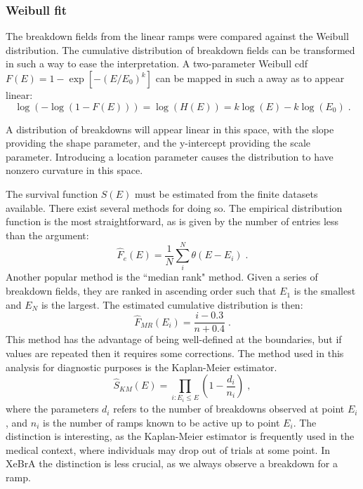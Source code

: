 \subsubsection{Weibull fit}
The breakdown fields from the linear ramps were compared against the Weibull distribution.
The cumulative distribution of breakdown fields can be transformed in such a way to ease the interpretation.
A two-parameter Weibull cdf $F(E) = 1 - \exp[-(E/E_0)^k]$ can be mapped in such a away as to appear linear: 
\begin{equation}
    \log (-\log(1-F(E))) = \log(H(E)) = k \log(E) - k \log(E_0)\;.
\end{equation}

A distribution of breakdowns will appear linear in this space, with the slope providing the shape parameter, and the y-intercept providing the scale parameter.
Introducing a location parameter causes the distribution to have nonzero curvature in this space.

The survival function $S(E)$ must be estimated from the finite datasets available.
There exist several methods for doing so.
The empirical distribution function is the most straightforward, as is given by the number of entries less than the argument: 
\begin{equation}
    \hat{F}_e(E) =\frac{1}{N} \sum_i^N \theta(E- E_i) \;.
\end{equation}
Another popular method is the ``median rank" method\cite{nassar_using_2005}.
Given a series of breakdown fields, they are ranked in ascending order such that $E_1$ is the smallest and $E_N$ is the largest.
The estimated cumulative distribution is then:
\begin{equation}
    \hat{F}_{MR}(E_i) = \frac{ i - 0.3}{n+0.4}\;.
\end{equation}
This method has the advantage of being well-defined at the boundaries, but if values are repeated then it requires some corrections.
The method used in this analysis for diagnostic purposes is the Kaplan-Meier estimator\cite{kaplan_nonparametric_1958}.
\begin{equation}
    \hat{S}_{KM}(E) = \prod_{i :E_i \leq E} (1- \frac{d_i}{n_i})\;,
\end{equation}
\noindent
where the parameters $d_i$ refers to the number of breakdowns observed at point $E_i$, and $n_i$ is the number of ramps known to be active up to point $E_i$. 
The distinction is interesting, as the Kaplan-Meier estimator is frequently used in the medical context, where individuals may drop out of trials at some point.
In XeBrA the distinction is less crucial, as we always observe a breakdown for a ramp.

